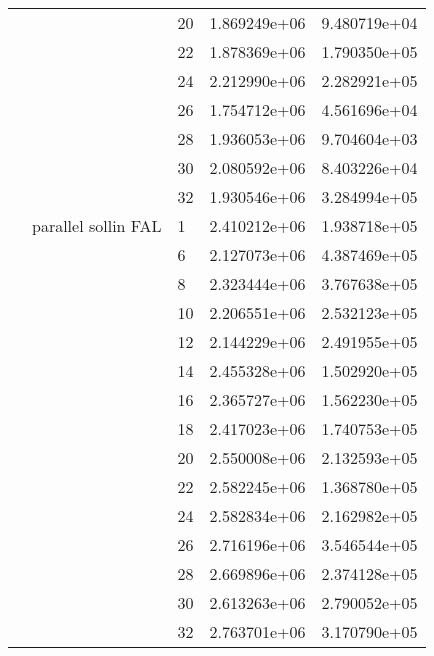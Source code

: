 \begin{tabular}{lllrr}
                      &                     & 20 &  1.869249e+06 &  9.480719e+04 \\
                      &                     & 22 &  1.878369e+06 &  1.790350e+05 \\
                      &                     & 24 &  2.212990e+06 &  2.282921e+05 \\
                      &                     & 26 &  1.754712e+06 &  4.561696e+04 \\
                      &                     & 28 &  1.936053e+06 &  9.704604e+03 \\
                      &                     & 30 &  2.080592e+06 &  8.403226e+04 \\
                      &                     & 32 &  1.930546e+06 &  3.284994e+05 \\
                      & parallel sollin FAL & 1  &  2.410212e+06 &  1.938718e+05 \\
                      &                     & 6  &  2.127073e+06 &  4.387469e+05 \\
                      &                     & 8  &  2.323444e+06 &  3.767638e+05 \\
                      &                     & 10 &  2.206551e+06 &  2.532123e+05 \\
                      &                     & 12 &  2.144229e+06 &  2.491955e+05 \\
                      &                     & 14 &  2.455328e+06 &  1.502920e+05 \\
                      &                     & 16 &  2.365727e+06 &  1.562230e+05 \\
                      &                     & 18 &  2.417023e+06 &  1.740753e+05 \\
                      &                     & 20 &  2.550008e+06 &  2.132593e+05 \\
                      &                     & 22 &  2.582245e+06 &  1.368780e+05 \\
                      &                     & 24 &  2.582834e+06 &  2.162982e+05 \\
                      &                     & 26 &  2.716196e+06 &  3.546544e+05 \\
                      &                     & 28 &  2.669896e+06 &  2.374128e+05 \\
                      &                     & 30 &  2.613263e+06 &  2.790052e+05 \\
                      &                     & 32 &  2.763701e+06 &  3.170790e+05 \\
\bottomrule
\end{tabular}
